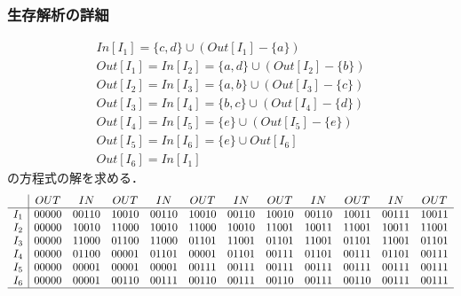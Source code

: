 \documentclass[ckj,dvipdfmx]{beamer}
\begin{document}
\begin{frame}
  \frametitle{生存解析の詳細}
  \[\begin{array}{l}
    In[I_1]=\{c,d\}\cup(Out[I_1]-\{a\})\\
    Out[I_1]=In[I_2]=\{a,d\}\cup(Out[I_2]-\{b\})\\
    Out[I_2]=In[I_3]=\{a,b\}\cup(Out[I_3]-\{c\})\\
    Out[I_3]=In[I_4]=\{b,c\}\cup(Out[I_4]-\{d\})\\
    Out[I_4]=In[I_5]=\{e\}\cup(Out[I_5]-\{e\})\\
    Out[I_5]=In[I_6]=\{e\}\cup Out[I_6]\\
    Out[I_6]=In[I_1]
  \end{array}
    \]
  の方程式の解を求める．
  {\tiny
  \[\begin{array}{c|ccccccccccc}
    & OUT & IN & OUT & IN & OUT & IN & OUT & IN & OUT & IN & OUT\\\hline
  I_1 & 00000 & 00110 & 10010 & 00110 & 10010 & 00110 & 10010 & 00110 & 10011 & 00111 & 10011\\
  I_2 & 00000 & 10010 & 11000 & 10010 & 11000 & 10010 & 11001 & 10011 & 11001 & 10011 & 11001\\
  I_3 & 00000 & 11000 & 01100 & 11000 & 01101 & 11001 & 01101 & 11001 & 01101 & 11001 & 01101\\
  I_4 & 00000 & 01100 & 00001 & 01101 & 00001 & 01101 & 00111 & 01101 & 00111 & 01101 & 00111\\
  I_5 & 00000 & 00001 & 00001 & 00001 & 00111 & 00111 & 00111 & 00111 & 00111 & 00111 & 00111\\
  I_6 & 00000 & 00001 & 00110 & 00111 & 00110 & 00111 & 00110 & 00111 & 00110 & 00111 & 00111\\\hline
  \end{array}
    \]
  }
\end{frame}
\end{document}
